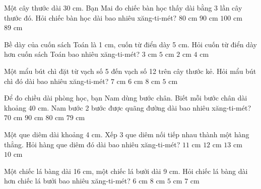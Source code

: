 \begin{ex} %
Một cây thước dài 30 cm. Bạn Mai đo chiếc bàn học thấy dài bằng 3 lần cây thước đó. Hỏi chiếc bàn học dài bao nhiêu xăng-ti-mét?
\choice
{$80\text{ cm}$}
{\True $90\text{ cm}$}
{$100\text{ cm}$}
{$89\text{ cm}$}
\end{ex}

\begin{ex} %
Bề dày của cuốn sách Toán là 1 cm, cuốn từ điển dày 5 cm. Hỏi cuốn từ điển dày hơn cuốn sách Toán bao nhiêu xăng-ti-mét?
\choice
{$3\text{ cm}$}
{$5\text{ cm}$}
{$2\text{ cm}$}
{\True $4\text{ cm}$}
\end{ex}

\begin{ex} %
Một mẩu bút chì đặt từ vạch số 5 đến vạch số 12 trên cây thước kẻ. Hỏi mẩu bút chì đó dài bao nhiêu xăng-ti-mét?
\choice
{\True $7\text{ cm}$}
{$6\text{ cm}$}
{$8\text{ cm}$}
{$5\text{ cm}$}
\end{ex}

\begin{ex} %
Để đo chiều dài phòng học, bạn Nam dùng bước chân. Biết mỗi bước chân dài khoảng 40 cm. Nam bước 2 bước được quãng đường dài bao nhiêu xăng-ti-mét?
\choice
{$70\text{ cm}$}
{$90\text{ cm}$}
{\True $80\text{ cm}$}
{$79\text{ cm}$}
\end{ex}

\begin{ex} %
Một que diêm dài khoảng 4 cm. Xếp 3 que diêm nối tiếp nhau thành một hàng thẳng. Hỏi hàng que diêm đó dài bao nhiêu xăng-ti-mét?
\choice
{$11\text{ cm}$}
{\True $12\text{ cm}$}
{$13\text{ cm}$}
{$10\text{ cm}$}
\end{ex}

\begin{ex} %
Một chiếc lá bàng dài 16 cm, một chiếc lá bưởi dài 9 cm. Hỏi chiếc lá bàng dài hơn chiếc lá bưởi bao nhiêu xăng-ti-mét?
\choice
{$6\text{ cm}$}
{$8\text{ cm}$}
{$5\text{ cm}$}
{\True $7\text{ cm}$}
\end{ex}

